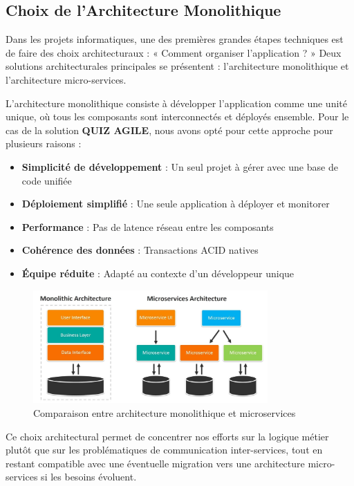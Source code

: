 \documentclass[12pt,a4paper]{report}
\begin{document}
\subsection{Choix de l'Architecture Monolithique}

Dans les projets informatiques, une des premières grandes étapes techniques est de faire des choix architecturaux : « Comment organiser l'application ? » Deux solutions architecturales principales se présentent : l'architecture monolithique et l'architecture micro-services.

L'architecture monolithique consiste à développer l'application comme une unité unique, où tous les composants sont interconnectés et déployés ensemble. Pour le cas de la solution \textbf{QUIZ AGILE}, nous avons opté pour cette approche pour plusieurs raisons :

\begin{itemize}
\item \textbf{Simplicité de développement} : Un seul projet à gérer avec une base de code unifiée
\item \textbf{Déploiement simplifié} : Une seule application à déployer et monitorer
\item \textbf{Performance} : Pas de latence réseau entre les composants
\item \textbf{Cohérence des données} : Transactions ACID natives
\item \textbf{Équipe réduite} : Adapté au contexte d'un développeur unique
\end{itemize}

\begin{figure}[H]
\centering
\includegraphics[width=0.8\textwidth]{latex_media/media/image15.jpeg}
\caption{Comparaison entre architecture monolithique et microservices}
\label{fig:comparaison-architectures-tech}
\end{figure}

Ce choix architectural permet de concentrer nos efforts sur la logique métier plutôt que sur les problématiques de communication inter-services, tout en restant compatible avec une éventuelle migration vers une architecture micro-services si les besoins évoluent.
\end{document}
